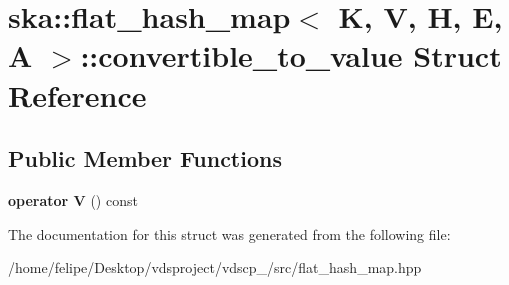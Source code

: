 \section{ska\+:\+:flat\+\_\+hash\+\_\+map$<$ K, V, H, E, A $>$\+:\+:convertible\+\_\+to\+\_\+value Struct Reference}
\label{structska_1_1flat__hash__map_1_1convertible__to__value}
\subsection*{Public Member Functions}
\begin{DoxyCompactItemize}
\item 
{\bfseries operator V} () const \label{structska_1_1flat__hash__map_1_1convertible__to__value_ab571586a204b0d1d43df564d730b453e}

\end{DoxyCompactItemize}


The documentation for this struct was generated from the following file\+:\begin{DoxyCompactItemize}
\item 
/home/felipe/\+Desktop/vdsproject/vdscp\+\_/src/flat\+\_\+hash\+\_\+map.\+hpp\end{DoxyCompactItemize}
